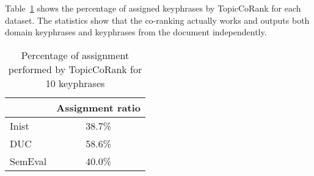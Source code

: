   Table~\ref{tab:assignment_ratio} shows the percentage of assigned keyphrases by TopicCoRank
  for each dataset. The statistics show that the co-ranking actually works and outputs both
  domain keyphrases and keyphrases from the document independently.
  \begin{table}[!h]
    \centering
    \begin{tabular}{l|c}
        \toprule
        & Assignment ratio\\
        \hline
        Inist & 38.7\%\\
        DUC & 58.6\%\\
        SemEval & 40.0\%\\
        \bottomrule
    \end{tabular}
    \caption{Percentage of assignment performed by TopicCoRank for 10 keyphrases
             \label{tab:assignment_ratio}}
  \end{table}
  
